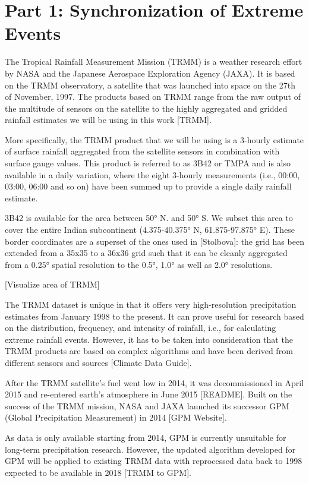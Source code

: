 \chapter{Part 1: Synchronization of Extreme Events}

The Tropical Rainfall Measurement Mission (TRMM) is a weather research effort by NASA and the Japanese Aerospace Exploration Agency (JAXA). It is based on the TRMM observatory, a satellite that was launched into space on the 27th of November, 1997. The products based on TRMM range from the raw output of the multitude of sensors on the satellite to the highly aggregated and gridded rainfall estimates we will be using in this work [TRMM].

More specifically, the TRMM product that we will be using is a 3-hourly estimate of surface rainfall aggregated from the satellite sensors in combination with surface gauge values. This product is referred to as 3B42 or TMPA and is also available in a daily variation, where the eight 3-hourly measurements (i.e., 00:00, 03:00, 06:00 and so on) have been summed up to provide a single daily rainfall estimate. 

3B42 is available for the area between 50° N. and 50° S. We subset this area to cover the entire Indian subcontinent (4.375-40.375° N, 61.875-97.875° E). These border coordinates are a superset of the ones used in [Stolbova]: the grid has been extended from a 35x35 to a 36x36 grid such that it can be cleanly aggregated from a 0.25° spatial resolution to the 0.5°, 1.0° as well as 2.0° resolutions.

[Visualize area of TRMM]

The TRMM dataset is unique in that it offers very high-resolution precipitation estimates from January 1998 to the present. It can prove useful for research based on the distribution, frequency, and intensity of rainfall, i.e., for calculating extreme rainfall events. However, it has to be taken into consideration that the TRMM products are based on complex algorithms and have been derived from different sensors and sources [Climate Data Guide].

After the TRMM satellite's fuel went low in 2014, it was decommissioned in April 2015 and re-entered earth's atmosphere in June 2015 [README]. Built on the success of the TRMM mission, NASA and JAXA launched its successor GPM (Global Precipitation Measurement) in 2014 [GPM Website].

As data is only available starting from 2014, GPM is currently unsuitable for long-term precipitation research. However, the updated algorithm developed for GPM will be applied to existing TRMM data with reprocessed data back to 1998 expected to be available in 2018 [TRMM to GPM].